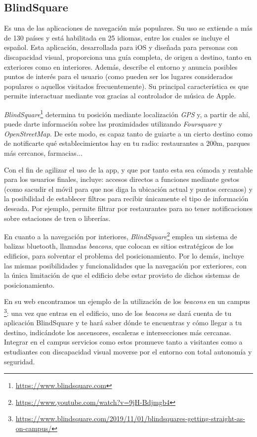 \subsection{BlindSquare}
Es una de las aplicaciones de navegación más populares. Su uso se extiende a más de 130 países y está habilitada en 25 idiomas, entre los cuales se incluye el español. Esta aplicación, desarrollada para iOS y diseñada para personas con discapacidad visual, proporciona una guía completa, de origen a destino, tanto en exteriores como en interiores. Además, describe el entorno y anuncia posibles puntos de interés para el usuario (como pueden ser los lugares considerados populares o aquellos visitados frecuentemente). Su principal característica es que permite interactuar mediante voz gracias al controlador de música de Apple. 

\textit{BlindSquare}\footnote{\url{https://www.blindsquare.com}} determina tu posición mediante localización \textit{GPS} y, a partir de ahí, puede darte información sobre las proximidades utilizando \textit{Foursquare} y \textit{OpenStreetMap}. De este modo, es capaz tanto de guiarte a un cierto destino como de notificarte qué establecimientos hay en tu radio: restaurantes a 200m, parques más cercanos, farmacias...

Con el fin de agilizar el uso de la app, y que por tanto esta sea cómoda y rentable para los usuarios finales, incluye: accesos directos a funciones mediante gestos (como sacudir el móvil para que nos diga la ubicación actual y puntos cercanos) y la posibilidad de establecer filtros para recibir únicamente el tipo de información deseada. Por ejemplo, permite filtrar por restaurantes para no tener notificaciones sobre estaciones de tren o librerías.

En cuanto a la navegación por interiores, \textit{BlindSquare}\footnote{\url{https://www.youtube.com/watch?v=9jH-Bdjmgb4}} emplea un sistema de balizas bluetooth, llamadas \textit{beacons}, que colocan es sitios estratégicos de los edificios, para solventar el problema del posicionamiento. Por lo demás, incluye las mismas posibilidades y funcionalidades que la navegación por exteriores, con la única limitación de que el edificio debe estar provisto de dichos sistemas de posicionamiento.

En su web encontramos un ejemplo de la utilización de los \textit{beacons} en un campus \footnote{\url{https://www.blindsquare.com/2019/11/01/blindsquares-getting-straight-as-on-campus/}}: una vez que entras en el edificio, uno de los \textit{beacons} se dará cuenta de tu aplicación BlindSquare y te hará saber dónde te encuentras y cómo llegar a tu destino, indicándote los ascensores, escaleras e intersecciones más cercanas. Integrar en el campus servicios como estos promueve tanto a visitantes como a estudiantes con discapacidad visual moverse por el entorno con total autonomía y seguridad.

